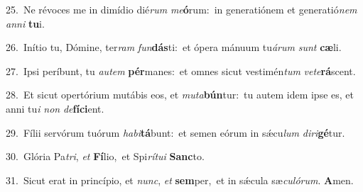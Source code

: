 {\numbfont\textcolor{\numbcolor}{25.}}~Ne révoces me in dimídio dié\textit{rum} \textit{me}\-\textbf{ó}rum:~\star in generatiónem et generatió\textit{nem} \textit{an}\-\textit{ni} \textbf{tu}\-i.\par
{\numbfont\textcolor{\numbcolor}{26.}}~Inítio tu, Dómine, ter\textit{ram} \textit{fun}\-\textbf{dás}ti:~\star et ópera mánuum tu\-\textit{á}\-\textit{rum} \textit{sunt} \textbf{cæ}\-li.\par
{\numbfont\textcolor{\numbcolor}{27.}}~Ipsi períbunt, tu \textit{au}\-\textit{tem} \textbf{pér}\-manes:~\star et omnes sicut vestimén\textit{tum} \textit{ve}\-\textit{te}\textbf{rá}scent.\par
{\numbfont\textcolor{\numbcolor}{28.}}~Et sicut opertórium mutábis eos, et \textit{mu}\-\textit{ta}\textbf{bún}tur:~\star tu autem idem ipse es, et anni tu\textit{i} \textit{non} \textit{de}\-\textbf{fí}\textbf{ci}ent.\par
{\numbfont\textcolor{\numbcolor}{29.}}~Fílii servórum tuórum \textit{ha}\-\textit{bi}\textbf{tá}bunt:~\star et semen eórum in sǽcu\textit{lum} \textit{di}\-\textit{ri}\textbf{gé}tur.\par
{\numbfont\textcolor{\numbcolor}{30.}}~Glória Pa\-\textit{tri}\-, \textit{et} \textbf{Fí}\-lio,~\star et Spi\-\textit{rí}\-\textit{tu}\textit{i} \textbf{Sanc}\-to.\par
{\numbfont\textcolor{\numbcolor}{31.}}~Sicut erat in princípio, et \textit{nunc}\-, \textit{et} \textbf{sem}\-per,~\star et in sǽcula sæ\-\textit{cu}\-\textit{ló}\textit{rum}. \textbf{A}\-men.\par

